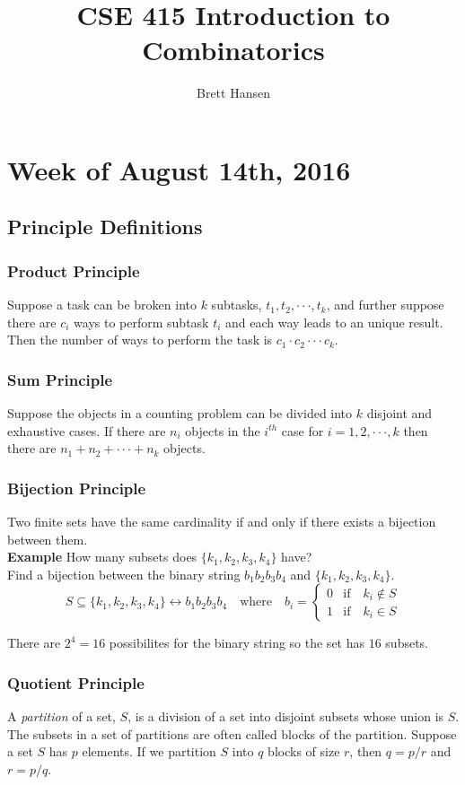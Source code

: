 \documentclass{article}
\title{CSE 415 Introduction to Combinatorics}
\author{Brett Hansen}
\date{}
\newcommand{\ellipse}{\cdot\cdot\cdot}
\begin{document}
\maketitle
\tableofcontents
\break

\section{Week of August 14th, 2016}
\subsection{Principle Definitions}
\subsubsection{Product Principle}
Suppose a task can be broken into $k$ subtasks, $t_1,t_2,\ellipse,t_k$, and further suppose there are $c_i$ ways to perform subtask $t_i$ and each way leads to an unique result. Then the number of ways to perform the task is $c_1 \cdot c_2 \ellipse c_k$.

\subsubsection{Sum Principle}
Suppose the objects in a counting problem can be divided into $k$ disjoint and exhaustive cases. If there are $n_i$ objects in the $i^{th}$ case for $i=1,2,\ellipse,k$ then there are $n_1+n_2+\ellipse+n_k$ objects.

\subsubsection{Bijection Principle}
Two finite sets have the same cardinality if and only if there exists a bijection between them. \\
\newline
\textbf{Example} \quad How many subsets does $\{k_1,k_2,k_3,k_4\}$ have? \\
Find a bijection between the binary string $b_1b_2b_3b_4$ and $\{k_1,k_2,k_3,k_4\}$. \\

$$S\subseteq\{k_1,k_2,k_3,k_4\}\longleftrightarrow b_1b_2b_3b_4 \quad\text{where}\quad b_i=
\begin{cases} 
	0 & \text{if}\quad k_i \notin S\\
	1 & \text{if}\quad k_i \in S
\end{cases}
$$

\noindent There are $2^4=16$ possibilites for the binary string so the set has $16$ subsets.

\subsubsection{Quotient Principle}
A \textit{partition} of a set, $S$, is a division of a set into disjoint subsets whose union is $S$. The subsets in a set of partitions are often called blocks of the partition. \newline
\noindent Suppose a set $S$ has $p$ elements. If we partition $S$ into $q$ blocks of size $r$, then $q=p/r$ and $r=p/q$.
\end{document}
